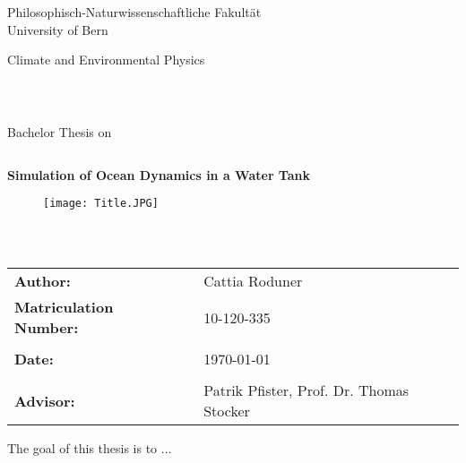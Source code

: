 \documentclass[12pt, a4paper, twoside]{article}
\begin{document}
\thispagestyle{empty}
\begin{center}
\Large{Philosophisch-Naturwissenschaftliche Fakultät}\\
\Large{University of Bern}\\
\end{center}


\begin{center}
\Large{Climate and Environmental Physics}
\end{center}
\begin{verbatim}



\end{verbatim}
\begin{center}
\large{Bachelor Thesis on}
\end{center}
\begin{verbatim}

\end{verbatim}
\begin{center}
\textbf{\Large{Simulation of Ocean Dynamics in a Water Tank}}\\
\end{center}

\begin{figure}[h]
 \centering
 \texttt{[image: Title.JPG]}
\end{figure}

\begin{verbatim}



\end{verbatim}

\begin{center}
\begin{tabular}{llll}

\textbf{Author:} & & Cattia Roduner& \\
\textbf{Matriculation Number:} & & 10-120-335& \\
& & \\
\textbf{Date:} & & \today &\\
& & \\
\textbf{Advisor:} & & Patrik Pfister, Prof. Dr. Thomas Stocker &\\

\end{tabular}

\end{center}
\newpage
\thispagestyle{empty}
\mbox{}
\newpage
\abstract
The goal of this thesis is to ...

\newpage
\tableofcontents
\newpage
\end{document}
